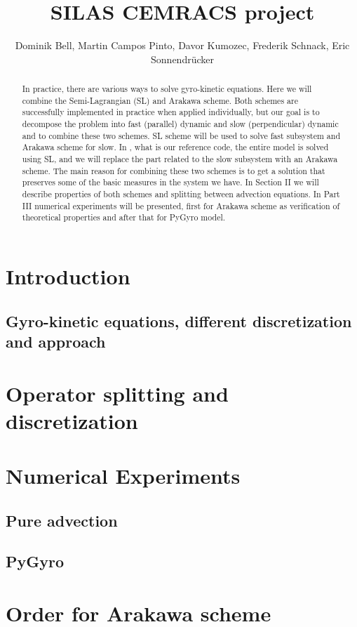 \documentclass{article}
\theoremstyle{definition}
\begin{document}
	\title{SILAS CEMRACS project}
	\author{Dominik Bell, Martin Campos Pinto, Davor Kumozec, Frederik Schnack, Eric Sonnendrücker}
	
	\maketitle

\begin{abstract}
In practice, there are various ways to solve gyro-kinetic equations. Here we will combine the Semi-Lagrangian (SL) and Arakawa scheme. Both schemes are successfully implemented in practice when applied individually, but our goal is to decompose the problem into fast (parallel) dynamic and slow (perpendicular) dynamic and to combine these two schemes. SL scheme will be used to solve fast subsystem and Arakawa scheme for slow. In \cite{pygyro_code}, what is our reference code, the entire model is solved using SL, and we will replace the part related to the slow subsystem with an Arakawa scheme. The main reason for combining these two schemes is to get a solution that preserves some of the basic measures in the system we have. In Section II we will describe properties of both schemes and splitting between advection equations. In Part III numerical experiments will be presented, first for Arakawa scheme as verification of theoretical properties and after that for PyGyro model.
\end{abstract}

\tableofcontents

\section{Introduction}
    \subsection{Gyro-kinetic equations, different discretization and approach}
        
        \label{sec:introduction}

\section{Operator splitting and discretization}
	\label{sec:splitting_discretization}
	

\section{Numerical Experiments}
\label{sec:experiments}
    \subsection{Pure advection}
    \subsection{PyGyro}
    
\newpage
\appendix
\section{Order for Arakawa scheme}
\label{sec:ara_order}


\newpage


\end{document}
